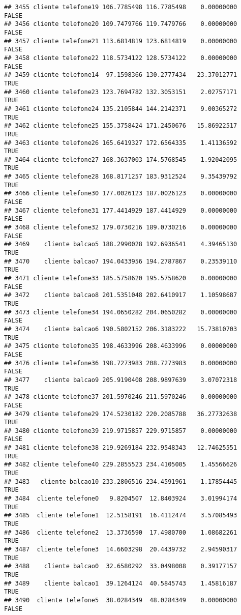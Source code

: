 \documentclass[
]{article}
\begin{document}
\begin{verbatim}
## 3455 cliente telefone19 106.7785498 116.7785498    0.00000000    FALSE
## 3456 cliente telefone20 109.7479766 119.7479766    0.00000000    FALSE
## 3457 cliente telefone21 113.6814819 123.6814819    0.00000000    FALSE
## 3458 cliente telefone22 118.5734122 128.5734122    0.00000000    FALSE
## 3459 cliente telefone14  97.1598366 130.2777434   23.37012771     TRUE
## 3460 cliente telefone23 123.7694782 132.3053151    2.02757171     TRUE
## 3461 cliente telefone24 135.2105844 144.2142371    9.00365272     TRUE
## 3462 cliente telefone25 155.3758424 171.2450676   15.86922517     TRUE
## 3463 cliente telefone26 165.6419327 172.6564335    1.41136592     TRUE
## 3464 cliente telefone27 168.3637003 174.5768545    1.92042095     TRUE
## 3465 cliente telefone28 168.8171257 183.9312524    9.35439792     TRUE
## 3466 cliente telefone30 177.0026123 187.0026123    0.00000000    FALSE
## 3467 cliente telefone31 177.4414929 187.4414929    0.00000000    FALSE
## 3468 cliente telefone32 179.0730216 189.0730216    0.00000000    FALSE
## 3469    cliente balcao5 188.2990028 192.6936541    4.39465130     TRUE
## 3470    cliente balcao7 194.0433956 194.2787867    0.23539110     TRUE
## 3471 cliente telefone33 185.5758620 195.5758620    0.00000000    FALSE
## 3472    cliente balcao8 201.5351048 202.6410917    1.10598687     TRUE
## 3473 cliente telefone34 194.0650282 204.0650282    0.00000000    FALSE
## 3474    cliente balcao6 190.5802152 206.3183222   15.73810703     TRUE
## 3475 cliente telefone35 198.4633996 208.4633996    0.00000000    FALSE
## 3476 cliente telefone36 198.7273983 208.7273983    0.00000000    FALSE
## 3477    cliente balcao9 205.9190408 208.9897639    3.07072318     TRUE
## 3478 cliente telefone37 201.5970246 211.5970246    0.00000000    FALSE
## 3479 cliente telefone29 174.5230182 220.2085788   36.27732638     TRUE
## 3480 cliente telefone39 219.9715857 229.9715857    0.00000000    FALSE
## 3481 cliente telefone38 219.9269184 232.9548343   12.74625551     TRUE
## 3482 cliente telefone40 229.2855523 234.4105005    1.45566626     TRUE
## 3483   cliente balcao10 233.2806516 234.4591961    1.17854445     TRUE
## 3484  cliente telefone0   9.8204507  12.8403924    3.01994174     TRUE
## 3485  cliente telefone1  12.5158191  16.4112474    3.57085493     TRUE
## 3486  cliente telefone2  13.3736590  17.4980700    1.08682261     TRUE
## 3487  cliente telefone3  14.6603298  20.4439732    2.94590317     TRUE
## 3488    cliente balcao0  32.6580292  33.0498008    0.39177157     TRUE
## 3489    cliente balcao1  39.1264124  40.5845743    1.45816187     TRUE
## 3490  cliente telefone5  38.0284349  48.0284349    0.00000000    FALSE

\end{verbatim}
\end{document}
